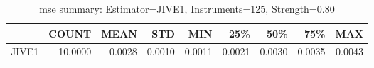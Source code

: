 \begin{table}[ht]
\centering
\caption{mse summary: Estimator=JIVE1, Instruments=125, Strength=0.80}
\begin{tabular}{lrrrrrrrr}
\toprule
 & COUNT & MEAN & STD & MIN & 25\% & 50\% & 75\% & MAX \\
\midrule
JIVE1 & 10.0000 & 0.0028 & 0.0010 & 0.0011 & 0.0021 & 0.0030 & 0.0035 & 0.0043 \\
\bottomrule
\end{tabular}
\end{table}
